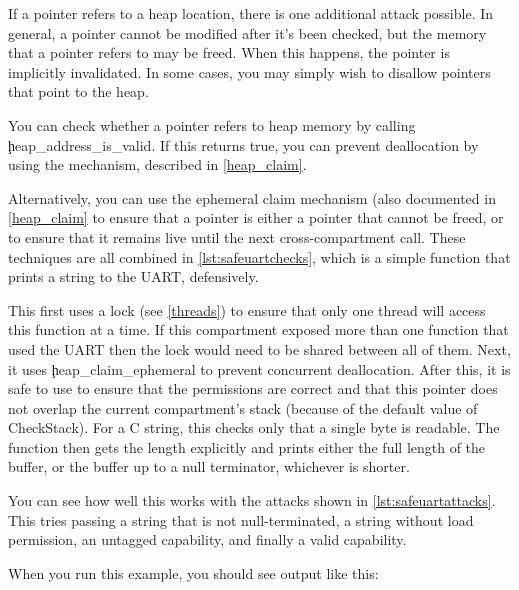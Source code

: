 If a pointer refers to a heap location, there is one additional attack possible.
In general, a pointer cannot be modified after it's been checked, but the memory that a pointer refers to may be freed.
When this happens, the pointer is implicitly invalidated.
In some cases, you may simply wish to disallow pointers that point to the heap.

You can check whether a pointer refers to heap memory by calling \c{heap_address_is_valid}.
If this returns true, you can prevent deallocation by using the  mechanism, described in \ref{heap_claim}.


Alternatively, you can use the ephemeral claim mechanism (also documented in \ref{heap_claim} to ensure that a pointer is either a pointer that cannot be freed, or to ensure that it remains live until the next cross-compartment call.
These techniques are all combined in \ref{lst:safeuartchecks}, which is a simple function that prints a string to the UART, defensively.

\codelisting[marker=safe_uart,caption=Checks to ensure that a function does not crash.,label=lst:safeuartchecks, filename=examples/check_arguments/uart.cc]{}

This first uses a lock (see \ref{threads}) to ensure that only one thread will access this function at a time.
If this compartment exposed more than one function that used the UART then the lock would need to be shared between all of them.
Next, it uses \c{heap_claim_ephemeral} to prevent concurrent deallocation.
After this, it is safe to use  to ensure that the permissions are correct and that this pointer does not overlap the current compartment's stack (because of the default value of CheckStack).
For a C string, this checks only that a single byte is readable.
The function then gets the length explicitly and prints either the full length of the buffer, or the buffer up to a null terminator, whichever is shorter.


You can see how well this works with the attacks shown in \ref{lst:safeuartattacks}.
This tries passing a string that is not null-terminated, a string without load permission, an untagged capability, and finally a valid capability.

\codelisting[marker=attacks,caption=Attempting to attack the safe UART.,label=lst:safeuartattacks, filename=examples/check_arguments/hello.cc]{}

When you run this example, you should see output like this:

